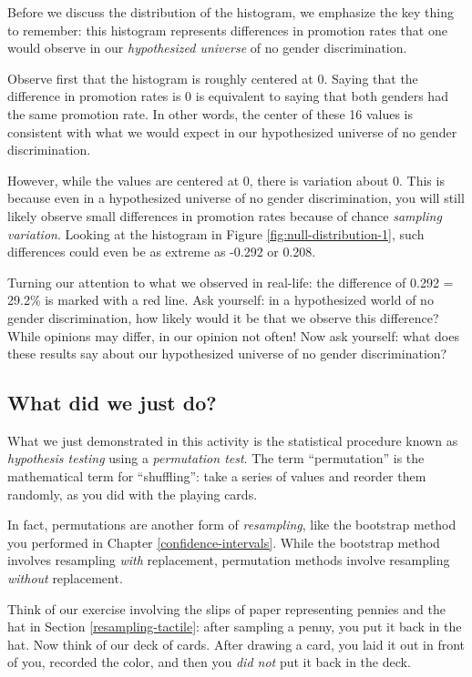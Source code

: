\documentclass[
]{book}
\begin{document}
Before we discuss the distribution of the histogram, we emphasize the key thing to remember: this histogram represents differences in promotion rates that one would observe in our \emph{hypothesized universe} of no gender discrimination.

Observe first that the histogram is roughly centered at 0. Saying that the difference in promotion rates is 0 is equivalent to saying that both genders had the same promotion rate. In other words, the center of these 16 values is consistent with what we would expect in our hypothesized universe of no gender discrimination.

However, while the values are centered at 0, there is variation about 0. This is because even in a hypothesized universe of no gender discrimination, you will still likely observe small differences in promotion rates because of chance \emph{sampling variation}. Looking at the histogram in Figure \ref{fig:null-distribution-1}, such differences could even be as extreme as -0.292 or 0.208.

Turning our attention to what we observed in real-life: the difference of 0.292 = 29.2\% is marked with a red line. Ask yourself: in a hypothesized world of no gender discrimination, how likely would it be that we observe this difference? While opinions may differ, in our opinion not often! Now ask yourself: what does these results say about our hypothesized universe of no gender discrimination?

\hypertarget{what-did-we-just-do}{%
\subsection{What did we just do?}\label{what-did-we-just-do}}

What we just demonstrated in this activity is the statistical procedure known as \emph{hypothesis testing} using a \emph{permutation test}. The term ``permutation''  is the mathematical term for ``shuffling'': take a series of values and reorder them randomly, as you did with the playing cards.

In fact, permutations are another form of \emph{resampling}, like the bootstrap method you performed in Chapter \ref{confidence-intervals}. While the bootstrap method involves resampling \emph{with} replacement, permutation methods involve resampling \emph{without} replacement.

Think of our exercise involving the slips of paper representing pennies and the hat in Section \ref{resampling-tactile}: after sampling a penny, you put it back in the hat. Now think of our deck of cards. After drawing a card, you laid it out in front of you, recorded the color, and then you \emph{did not} put it back in the deck.
\end{document}
